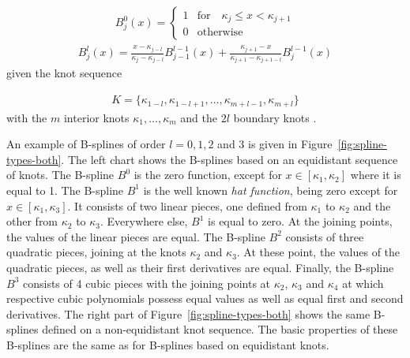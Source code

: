 \documentclass[10pt,a4paper]{report}
\begin{document}
\begin{align} \label{eq:Bspline_recDef1}
	B_j^0(x) = \begin{cases} 1 & \text{for} \quad \kappa_j \le x < \kappa_{j+1} \\ 
					 		 0 & \text{otherwise} 
	\end{cases}
\end{align}
\begin{align} \label{eq:Bspline_recDef2}
	B_j^l(x) = \frac{x - \kappa_{j-l}}{\kappa_{j} - \kappa_{j-l}} B_{j-1}^{l-1}(x) + \frac{\kappa_{j+1} - x}{\kappa_{j+1} - \kappa_{j+1-l}} B_{j}^{l-1}(x)
\end{align}
%
given the knot sequence 

\begin{align}\label{eq:knot_sequence}
	K = \{\kappa_{1-l}, \kappa_{1-l+1}, \dots, \kappa_{m+l-1}, \kappa_{m+l}\}
\end{align}
%
with the $m$ interior knots $\kappa_1, \dots, \kappa_m$ and the $2l$ boundary knots \cite{fahrmeir2007regression}. 

An example of B-splines of order $l=0, 1, 2$ and $3$ is given in Figure~\ref{fig:spline-types-both}. The left chart shows the B-splines based on an equidistant sequence of knots. The B-spline $B^0$ is the zero function, except for $x \in [\kappa_1, \kappa_2]$ where it is equal to 1. The B-spline $B^1$ is the well known \emph{hat function}, being zero except for $x \in [\kappa_1, \kappa_3]$. It consists of two linear pieces, one defined from $\kappa_1$ to $\kappa_2$ and the other from $\kappa_2$ to $\kappa_3$. Everywhere else, $B^1$ is equal to zero. At the joining points, the values of the linear pieces are equal. The B-spline $B^2$ consists of three quadratic pieces, joining at the knots $\kappa_2$ and $\kappa_3$. At these point, the values of the quadratic pieces, as well as their first derivatives are equal. Finally, the B-spline $B^3$ consists of 4 cubic pieces with the joining points at $\kappa_2$, $\kappa_3$ and $\kappa_4$ at which respective cubic polynomials possess equal values as well as equal first and second derivatives. The right part of Figure~\ref{fig:spline-types-both} shows the same B-splines defined on a non-equidistant knot sequence. The basic properties of these B-splines are the same as for B-splines based on equidistant knots. 
\end{document}
